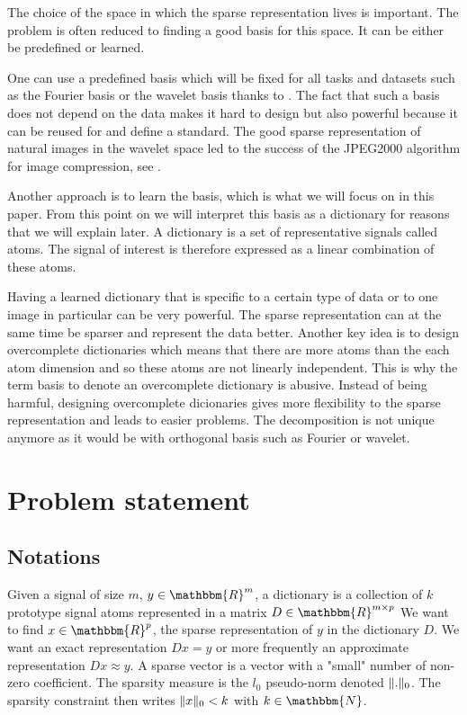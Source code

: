 \documentclass[a4paper,11pt]{article}
\newcommand{\RR}{\mathbbm{R}} %
\DeclarePairedDelimiter\norm{\lVert}{\rVert} %
\begin{document}
The choice of the space in which the sparse representation lives is important.
The problem is often reduced to finding a good basis for this space.
It can be either be predefined or learned.

One can use a predefined basis which will be fixed for all tasks and datasets such as the Fourier basis or the wavelet basis thanks to \cite{mallat99}.
The fact that such a basis does not depend on the data makes it hard to design but also powerful because it can be reused for and define a standard.
The good sparse representation of natural images in the wavelet space led to the success of the JPEG2000 algorithm for image compression, see \cite{marcellin00}.

Another approach is to learn the basis, which is what we will focus on in this paper.
From this point on we will interpret this basis as a dictionary for reasons that we will explain later.
A dictionary is a set of representative signals called atoms.
The signal of interest is therefore expressed as a linear combination of these atoms.

Having a learned dictionary that is specific to a certain type of data or to one image in particular can be very powerful.
The sparse representation can at the same time be sparser and represent the data better.
Another key idea is to design overcomplete dictionaries which means that there are more atoms than the each atom dimension and so these atoms are not linearly independent.
This is why the term basis to denote an overcomplete dictionary is abusive.
Instead of being harmful, designing overcomplete dicionaries gives more flexibility to the sparse representation and leads to easier problems.
The decomposition is not unique anymore as it would be with orthogonal basis such as Fourier or wavelet.


\section{Problem statement}
\subsection{Notations}
Given a signal of size $m$, \textbf{$y \in \RR^m$}, a dictionary is a collection of $k$ prototype signal atoms represented in a matrix $D \in \RR^{m \times p}$
We want to find $x \in \RR^p$, the sparse representation of $y$ in the dictionary $D$.
We want an exact representation $D x = y$ or more frequently an approximate representation $ D x \approx y$.
A sparse vector is a vector with a "small" number of non-zero coefficient.
The sparsity measure is the $l_0$ pseudo-norm denoted $\norm{.}_0$.
The sparsity constraint then writes $\norm{x}_0<k$ with $k \in \mathbbm{N}$.
\end{document}
